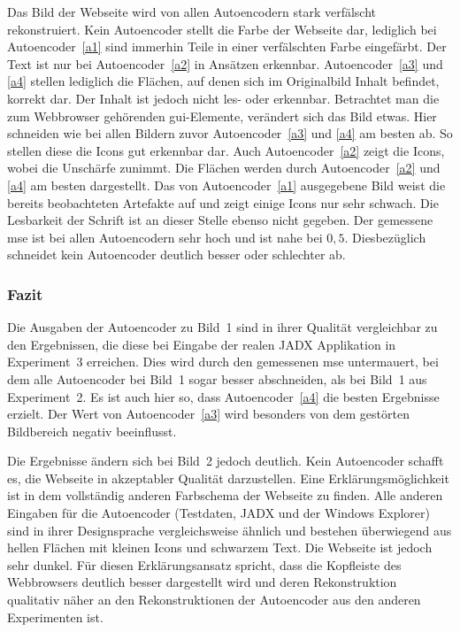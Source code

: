 Das Bild der Webseite wird von allen Autoencodern stark verfälscht rekonstruiert. Kein Autoencoder stellt die Farbe der Webseite dar, lediglich bei Autoencoder~\ref{a1} sind immerhin Teile in einer verfälschten Farbe eingefärbt. Der Text ist nur bei Autoencoder~\ref{a2} in Ansätzen erkennbar. Autoencoder~\ref{a3} und \ref{a4} stellen lediglich die Flächen, auf denen sich im Originalbild Inhalt befindet, korrekt dar. Der Inhalt ist jedoch nicht les- oder erkennbar. Betrachtet man die zum Webbrowser gehörenden \gls{gui}-Elemente, verändert sich das Bild etwas. Hier schneiden wie bei allen Bildern zuvor Autoencoder~\ref{a3} und \ref{a4} am besten ab. So stellen diese die Icons gut erkennbar dar. Auch Autoencoder~\ref{a2} zeigt die Icons, wobei die Unschärfe zunimmt. Die Flächen werden durch Autoencoder~\ref{a2} und \ref{a4} am besten dargestellt. Das von Autoencoder~\ref{a1} ausgegebene Bild weist die bereits beobachteten Artefakte auf und zeigt einige Icons nur sehr schwach. Die Lesbarkeit der Schrift ist an dieser Stelle ebenso nicht gegeben.
Der gemessene \gls{mse} ist bei allen Autoencodern sehr hoch und ist nahe bei $0,5$. Diesbezüglich schneidet kein Autoencoder deutlich besser oder schlechter ab.

\subsubsection*{Fazit}
Die Ausgaben der Autoencoder zu Bild~1 sind in ihrer Qualität vergleichbar zu den Ergebnissen, die diese bei Eingabe der realen JADX Applikation in Experiment~3 erreichen. Dies wird durch den gemessenen \gls{mse} untermauert, bei dem alle Autoencoder bei Bild~1 sogar besser abschneiden, als bei Bild~1 aus Experiment~2. Es ist auch hier so, dass Autoencoder~\ref{a4} die besten Ergebnisse erzielt.
Der Wert von Autoencoder~\ref{a3} wird besonders von dem gestörten Bildbereich negativ beeinflusst.

Die Ergebnisse ändern sich bei Bild~2 jedoch deutlich. Kein Autoencoder schafft es, die Webseite in akzeptabler Qualität darzustellen. Eine Erklärungsmöglichkeit ist in dem vollständig anderen Farbschema der Webseite zu finden. Alle anderen Eingaben für die Autoencoder (Testdaten, JADX und der Windows Explorer) sind in ihrer Designsprache vergleichsweise ähnlich und bestehen überwiegend aus hellen Flächen mit kleinen Icons und schwarzem Text. Die Webseite ist jedoch sehr dunkel. Für diesen Erklärungsansatz spricht, dass die Kopfleiste des Webbrowsers deutlich besser dargestellt wird und deren Rekonstruktion qualitativ näher an den Rekonstruktionen der Autoencoder aus den anderen Experimenten ist.

